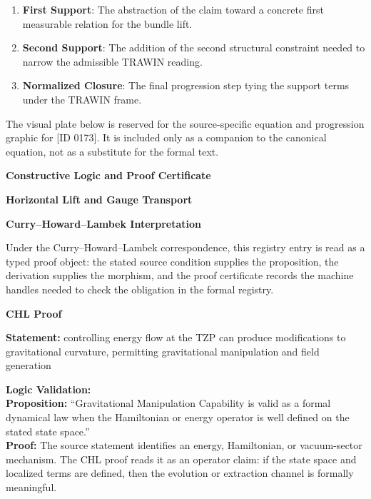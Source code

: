 \begin{enumerate}[leftmargin=1.6em,itemsep=6pt,topsep=4pt]
\item \textbf{First Support}: The abstraction of the claim toward a concrete first measurable relation for the bundle lift.
\item \textbf{Second Support}: The addition of the second structural constraint needed to narrow the admissible TRAWIN reading.
\item \textbf{Normalized Closure}: The final progression step tying the support terms under the TRAWIN frame.
\end{enumerate}

\begingroup\footnotesize\sloppy
The visual plate below is reserved for the source-specific equation and progression graphic for [ID 0173]. It is included only as a companion to the canonical equation, not as a substitute for the formal text.
\par\endgroup
\ifTZPDarkEdition
{}
\fi

\clearpage
\begingroup\tzpsupportsetup
\noindent\textbf{\fontsize{10.8pt}{12.8pt}\selectfont [ID 0173] Constructive Logic and Proof Certificate}\par
\noindent\textbf{\fontsize{10pt}{12pt}\selectfont Horizontal Lift and Gauge Transport}\par
\vspace{0.45em}
\begingroup
\footnotesize
\setlength{\parskip}{0.22em}
\setlength{\parindent}{0pt}
\noindent\textbf{Curry--Howard--Lambek Interpretation}\par
Under the Curry--Howard--Lambek correspondence, this registry entry is read as a typed proof
object: the stated source condition supplies the proposition, the derivation supplies the
morphism, and the proof certificate records the machine handles needed to check the obligation
in the formal registry.

\vspace{0.45em}
\noindent\textbf{CHL Proof}\par
\textbf{Statement:} controlling energy flow at the TZP can produce modifications to gravitational curvature,
permitting gravitational manipulation and field generation

\textbf{Logic Validation:}\\
\textbf{Proposition:} ``Gravitational Manipulation Capability is valid as a formal dynamical law when the
Hamiltonian or energy operator is well defined on the stated state space.''\\
\textbf{Proof:} The source statement identifies an energy, Hamiltonian, or vacuum-sector mechanism. The
CHL proof reads it as an operator claim: if the state space and localized terms are
defined, then the evolution or extraction channel is formally meaningful.


